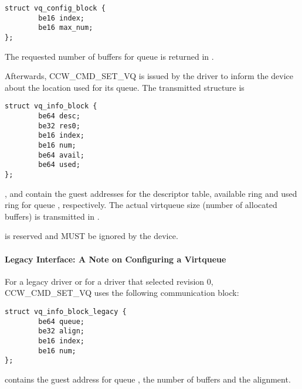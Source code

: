 \begin{lstlisting}
struct vq_config_block {
        be16 index;
        be16 max_num;
};
\end{lstlisting}

The requested number of buffers for queue  is returned in
.

Afterwards, CCW_CMD_SET_VQ is issued by the driver to inform the
device about the location used for its queue. The transmitted
structure is

\begin{lstlisting}
struct vq_info_block {
        be64 desc;
        be32 res0;
        be16 index;
        be16 num;
        be64 avail;
        be64 used;
};
\end{lstlisting}

,  and  contain the guest addresses for the descriptor table,
available ring and used ring for queue , respectively. The actual
virtqueue size (number of allocated buffers) is transmitted in .


 is reserved and MUST be ignored by the device.

\paragraph{Legacy Interface: A Note on Configuring a Virtqueue}\label{sec:Virtio Transport Options / Virtio over channel I/O / Device Initialization / Configuring a Virtqueue / Legacy Interface: A Note on Configuring a Virtqueue}

For a legacy driver or for a driver that selected revision 0,
CCW_CMD_SET_VQ uses the following communication block:

\begin{lstlisting}
struct vq_info_block_legacy {
        be64 queue;
        be32 align;
        be16 index;
        be16 num;
};
\end{lstlisting}

 contains the guest address for queue ,  the number of buffers
and  the alignment.

